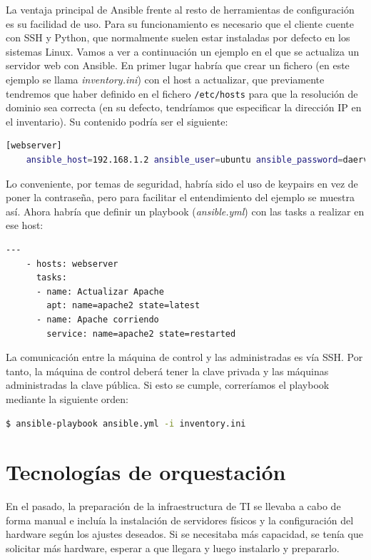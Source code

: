	La ventaja principal de Ansible frente al resto de herramientas de configuración es su facilidad de uso. Para su funcionamiento es necesario que el cliente cuente con SSH y Python, que normalmente suelen estar instaladas por defecto en los sistemas Linux. Vamos a ver a continuación un ejemplo en el que se actualiza un servidor web con Ansible. En primer lugar habría que crear un fichero (en este ejemplo se llama \textit{inventory.ini}) con el host a actualizar, que previamente tendremos que haber definido en el fichero \texttt{/etc/hosts} para que la resolución de dominio sea correcta (en su defecto, tendríamos que especificar la dirección IP en el inventario). Su contenido podría ser el siguiente:
	
\clearpage
\begin{lstlisting}[language=Bash, caption=Contenido del fichero inventory.ini]
	[webserver]
	ansible_host=192.168.1.2 ansible_user=ubuntu ansible_password=daerv
\end{lstlisting}	
	
	Lo conveniente, por temas de seguridad, habría sido el uso de keypairs en vez de poner la contraseña, pero para facilitar el entendimiento del ejemplo se muestra así. Ahora habría que definir un playbook (\textit{ansible.yml}) con las tasks a realizar en ese host:

\vspace{0.2cm}
\begin{lstlisting}[language=Bash, caption=Contenido del fichero ansible.yml]
	---
	- hosts: webserver
	  tasks:
	  - name: Actualizar Apache 
	    apt: name=apache2 state=latest
	  - name: Apache corriendo  
	    service: name=apache2 state=restarted
\end{lstlisting}

	La comunicación entre la máquina de control y las administradas es vía SSH. Por tanto, la máquina de control deberá tener la clave privada y las máquinas administradas la clave pública. Si esto se cumple, correríamos el playbook mediante la siguiente orden:

\vspace{0.2cm}
\begin{lstlisting}[language=Bash]
        		$ ansible-playbook ansible.yml -i inventory.ini 
\end{lstlisting}
\clearpage

\section{Tecnologías de orquestación} \label{sec:orq}
	En el pasado, la preparación de la infraestructura de TI se llevaba a cabo de forma manual e incluía la instalación de servidores físicos y la configuración del hardware según los ajustes deseados. Si se necesitaba más capacidad, se tenía que solicitar más hardware, esperar a que llegara y luego instalarlo y prepararlo.~\cite{orq1} 

